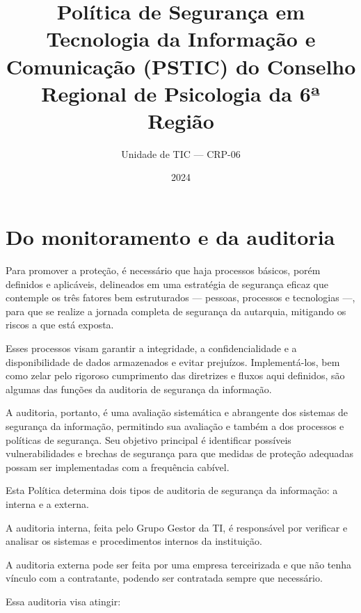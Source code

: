 \documentclass[openright, twoside, a4paper]{memoir}
\title{Política de Segurança em Tecnologia da Informação e Comunicação
(PSTIC) do Conselho Regional de Psicologia da 6ª Região}
\author{Unidade de TIC — CRP-06}
\date{2024}
\begin{document}
\frontmatter
%



%
\tableofcontents*
%
\mainmatter
%


\chapter{Do monitoramento e da
auditoria}

Para promover a proteção, é necessário que haja processos básicos, porém
definidos e aplicáveis, delineados em uma estratégia de segurança eficaz
que contemple os três fatores bem estruturados --- pessoas, processos e
tecnologias ---, para que se realize a jornada completa de segurança da
autarquia, mitigando os riscos a que está exposta.

Esses processos visam garantir a integridade, a confidencialidade e a
disponibilidade de dados armazenados e evitar prejuízos. Implementá-los,
bem como zelar pelo rigoroso cumprimento das diretrizes e fluxos aqui
definidos, são algumas das funções da auditoria de segurança da
informação.

A auditoria, portanto, é uma avaliação sistemática e abrangente dos
sistemas de segurança da informação, permitindo sua avaliação e também a
dos processos e políticas de segurança. Seu objetivo principal é
identificar possíveis vulnerabilidades e brechas de segurança para que
medidas de proteção adequadas possam ser implementadas com a frequência
cabível.

Esta Política determina dois tipos de auditoria de segurança da
informação: a interna e a externa.

A auditoria interna, feita pelo Grupo Gestor da TI, é responsável por
verificar e analisar os sistemas e procedimentos internos da
instituição.

A auditoria externa pode ser feita por uma empresa terceirizada e que
não tenha vínculo com a contratante, podendo ser contratada sempre que
necessário.

Essa auditoria visa atingir:
\end{document}
